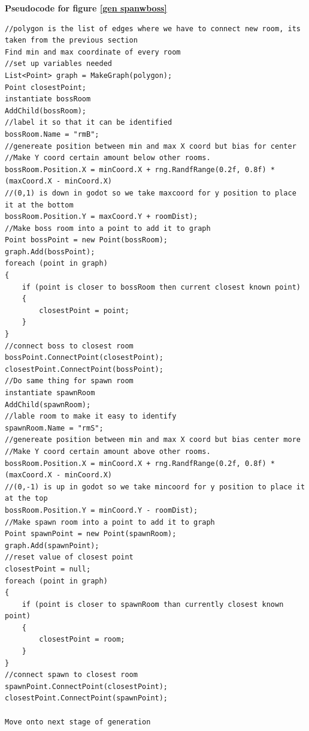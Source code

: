 \documentclass{article}
\begin{document}
\textbf{Pseudocode for figure \ref{gen spanwboss}}
\begin{lstlisting}
//polygon is the list of edges where we have to connect new room, its taken from the previous section
Find min and max coordinate of every room
//set up variables needed
List<Point> graph = MakeGraph(polygon);
Point closestPoint;
instantiate bossRoom
AddChild(bossRoom);
//label it so that it can be identified
bossRoom.Name = "rmB";
//genereate position between min and max X coord but bias for center
//Make Y coord certain amount below other rooms.
bossRoom.Position.X = minCoord.X + rng.RandfRange(0.2f, 0.8f) * (maxCoord.X - minCoord.X)
//(0,1) is down in godot so we take maxcoord for y position to place it at the bottom
bossRoom.Position.Y = maxCoord.Y + roomDist);
//Make boss room into a point to add it to graph
Point bossPoint = new Point(bossRoom);
graph.Add(bossPoint);
foreach (point in graph)
{
    if (point is closer to bossRoom then current closest known point)
    {
        closestPoint = point;
    }
}
//connect boss to closest room
bossPoint.ConnectPoint(closestPoint);
closestPoint.ConnectPoint(bossPoint);
//Do same thing for spawn room
instantiate spawnRoom
AddChild(spawnRoom);
//lable room to make it easy to identify
spawnRoom.Name = "rmS";
//genereate position between min and max X coord but bias center more
//Make Y coord certain amount above other rooms.
bossRoom.Position.X = minCoord.X + rng.RandfRange(0.2f, 0.8f) * (maxCoord.X - minCoord.X)
//(0,-1) is up in godot so we take mincoord for y position to place it at the top
bossRoom.Position.Y = minCoord.Y - roomDist);
//Make spawn room into a point to add it to graph
Point spawnPoint = new Point(spawnRoom);
graph.Add(spawnPoint);
//reset value of closest point
closestPoint = null;
foreach (point in graph)
{
    if (point is closer to spawnRoom than currently closest known point)
    {
        closestPoint = room;
    }
}
//connect spawn to closest room
spawnPoint.ConnectPoint(closestPoint);
closestPoint.ConnectPoint(spawnPoint);

Move onto next stage of generation
\end{lstlisting}
\end{document}

